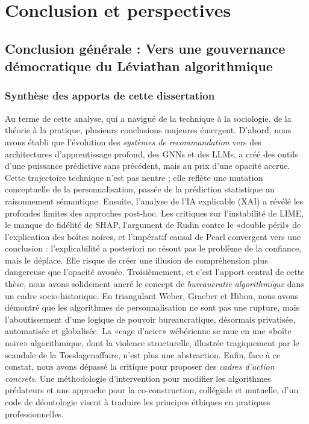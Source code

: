 \part{Conclusion et perspectives}
\chapter{Conclusion générale : Vers une gouvernance démocratique du Léviathan algorithmique}
\label{chap:conclusion}

\section{Synthèse des apports de cette dissertation}
Au terme de cette analyse, qui a navigué de la technique à la sociologie, de la théorie à la pratique, plusieurs conclusions majeures émergent.
D'abord, nous avons établi que l'évolution des \textit{systèmes de recommandation} vers des architectures d'apprentissage profond, des GNNs et des LLMs, a créé des outils d'une puissance prédictive sans précédent, mais au prix d'une opacité accrue. Cette trajectoire technique n'est pas neutre ; elle reflète une mutation conceptuelle de la personnalisation, passée de la prédiction statistique au raisonnement sémantique.
Ensuite, l'analyse de l'IA explicable (XAI) a révélé les profondes limites des approches post-hoc. Les critiques sur l'instabilité de LIME, le manque de fidélité de SHAP, l'argument de Rudin contre le «double péril» de l'explication des boîtes noires, et l'impératif causal de Pearl convergent vers une conclusion : l'explicabilité a posteriori ne résout pas le problème de la confiance, mais le déplace. Elle risque de créer une illusion de compréhension plus dangereuse que l'opacité avouée.
Troisièmement, et c'est l'apport central de cette thèse, nous avons solidement ancré le concept de \textit{bureaucratie algorithmique} dans un cadre socio-historique. En triangulant Weber, Graeber et Hibou, nous avons démontré que les algorithmes de personnalisation ne sont pas une rupture, mais l'aboutissement d'une logique de pouvoir bureaucratique, désormais privatisée, automatisée et globalisée. La «cage d'acier» wébérienne se mue en une «boîte noire» algorithmique, dont la violence structurelle, illustrée tragiquement par le scandale de la Toeslagenaffaire, n'est plus une abstraction.
Enfin, face à ce constat, nous avons dépassé la critique pour proposer des \textit{cadres d'action concrets}. Une méthodologie d'intervention pour modifier les algorithmes prédateurs et une approche pour la co-construction, collégiale et mutuelle, d'un code de déontologie visent à traduire les principes éthiques en pratiques professionnelles.
\vspace{4em}
